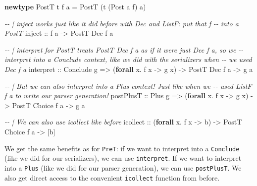 \documentclass[]{article}
\newenvironment{Shaded}{}{}
\newcommand{\CommentTok}[1]{\textcolor[rgb]{0.38,0.63,0.69}{\textit{#1}}}
\newcommand{\DataTypeTok}[1]{\textcolor[rgb]{0.56,0.13,0.00}{#1}}
\newcommand{\KeywordTok}[1]{\textcolor[rgb]{0.00,0.44,0.13}{\textbf{#1}}}
\newcommand{\NormalTok}[1]{#1}
\newcommand{\OperatorTok}[1]{\textcolor[rgb]{0.40,0.40,0.40}{#1}}
\newcommand{\OtherTok}[1]{\textcolor[rgb]{0.00,0.44,0.13}{#1}}
\begin{document}
\begin{Shaded}
\begin{Highlighting}[]
\KeywordTok{newtype} \DataTypeTok{PostT}\NormalTok{ t f a }\OtherTok{=} \DataTypeTok{PostT}\NormalTok{ (t (}\DataTypeTok{Post}\NormalTok{ a f) a)}

\CommentTok{{-}{-} | \textasciigrave{}inject\textasciigrave{} works just like it did before with \textasciigrave{}Dec\textasciigrave{} and \textasciigrave{}ListF\textasciigrave{}: put that \textasciigrave{}f\textasciigrave{}}
\CommentTok{{-}{-} into a \textasciigrave{}PostT\textasciigrave{}}
\OtherTok{inject ::}\NormalTok{ f a }\OtherTok{{-}>} \DataTypeTok{PostT} \DataTypeTok{Dec}\NormalTok{ f a}

\CommentTok{{-}{-} | interpret for PostT treats \textasciigrave{}PostT Dec f a\textasciigrave{} as if it were just \textasciigrave{}Dec f a\textasciigrave{}, so we}
\CommentTok{{-}{-} interpret into a \textasciigrave{}Conclude\textasciigrave{} context, like we did with the serializers when}
\CommentTok{{-}{-} we used \textasciigrave{}Dec f a\textasciigrave{}}
\NormalTok{interpret}
\OtherTok{    ::} \DataTypeTok{Conclude}\NormalTok{ g}
    \OtherTok{=>}\NormalTok{ (}\KeywordTok{forall}\NormalTok{ x}\OperatorTok{.}\NormalTok{ f x }\OtherTok{{-}>}\NormalTok{ g x)}
    \OtherTok{{-}>} \DataTypeTok{PostT} \DataTypeTok{Dec}\NormalTok{ f a}
    \OtherTok{{-}>}\NormalTok{ g a}

\CommentTok{{-}{-} | But we can also interpret into a \textasciigrave{}Plus\textasciigrave{} context!  Just like when we}
\CommentTok{{-}{-} used \textasciigrave{}ListF f a\textasciigrave{} to write our parser generation!}
\NormalTok{postPlusT}
\OtherTok{    ::} \DataTypeTok{Plus}\NormalTok{ g}
    \OtherTok{=>}\NormalTok{ (}\KeywordTok{forall}\NormalTok{ x}\OperatorTok{.}\NormalTok{ f x }\OtherTok{{-}>}\NormalTok{ g x)}
    \OtherTok{{-}>} \DataTypeTok{PostT} \DataTypeTok{Choice}\NormalTok{ f a}
    \OtherTok{{-}>}\NormalTok{ g a}

\CommentTok{{-}{-} | We can also use icollect like before}
\NormalTok{icollect}
\OtherTok{    ::}\NormalTok{ (}\KeywordTok{forall}\NormalTok{ x}\OperatorTok{.}\NormalTok{ f x }\OtherTok{{-}>}\NormalTok{ b)}
    \OtherTok{{-}>} \DataTypeTok{PostT} \DataTypeTok{Choice}\NormalTok{ f a}
    \OtherTok{{-}>}\NormalTok{ [b]}
\end{Highlighting}
\end{Shaded}

We get the same benefits as for \texttt{PreT}: if we want to interpret into a
\texttt{Conclude} (like we did for our serializers), we can use
\texttt{interpret}. If we want to interpret into a \texttt{Plus} (like we did
for our parser generation), we can use \texttt{postPlusT}. We also get direct
access to the convenient \texttt{icollect} function from before.
\end{document}
